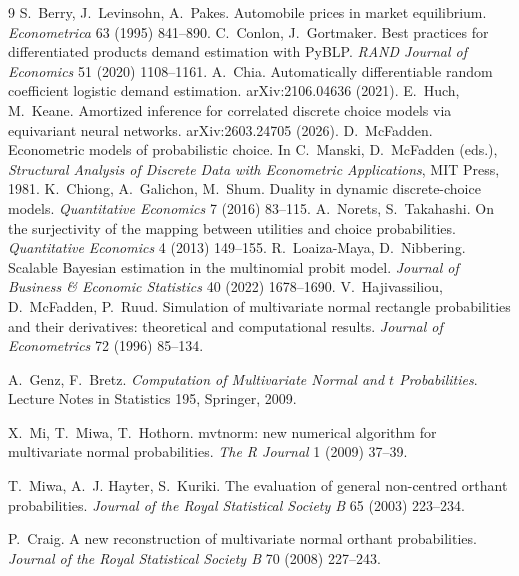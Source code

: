 \documentclass[12pt]{article}
\theoremstyle{remark}
\begin{document}
\begin{thebibliography}{9}
 S.~Berry, J.~Levinsohn, A.~Pakes. Automobile prices in
market equilibrium. \emph{Econometrica} 63 (1995) 841--890.
 C.~Conlon, J.~Gortmaker. Best practices for
differentiated products demand estimation with PyBLP. \emph{RAND Journal of
Economics} 51 (2020) 1108--1161.
 A.~Chia. Automatically differentiable random coefficient
logistic demand estimation. arXiv:2106.04636 (2021).
 E.~Huch, M.~Keane. Amortized inference for correlated
discrete choice models via equivariant neural networks. arXiv:2603.24705
(2026).
 D.~McFadden. Econometric models of probabilistic
choice. In C.~Manski, D.~McFadden (eds.), \emph{Structural Analysis of
Discrete Data with Econometric Applications}, MIT Press, 1981.
 K.~Chiong, A.~Galichon, M.~Shum. Duality in dynamic
discrete-choice models. \emph{Quantitative Economics} 7 (2016) 83--115.
 A.~Norets, S.~Takahashi. On the surjectivity of the
mapping between utilities and choice probabilities. \emph{Quantitative
Economics} 4 (2013) 149--155.
 R.~Loaiza-Maya, D.~Nibbering. Scalable Bayesian
estimation in the multinomial probit model. \emph{Journal of Business \&
Economic Statistics} 40 (2022) 1678--1690.
 V.~Hajivassiliou, D.~McFadden, P.~Ruud. Simulation of
multivariate normal rectangle probabilities and their derivatives:
theoretical and computational results. \emph{Journal of Econometrics} 72
(1996) 85--134.

 A.~Genz, F.~Bretz.
\emph{Computation of Multivariate Normal and $t$ Probabilities}. Lecture
Notes in Statistics 195, Springer, 2009.

 X.~Mi, T.~Miwa,
T.~Hothorn. mvtnorm: new numerical algorithm for multivariate normal
probabilities. \emph{The R Journal} 1 (2009) 37--39.

 T.~Miwa,
A.~J. Hayter, S.~Kuriki. The evaluation of general non-centred orthant
probabilities. \emph{Journal of the Royal Statistical Society B} 65
(2003) 223--234.

 P.~Craig. A new reconstruction of
multivariate normal orthant probabilities. \emph{Journal of the Royal
Statistical Society B} 70 (2008) 227--243.


\end{thebibliography}
\end{document}
